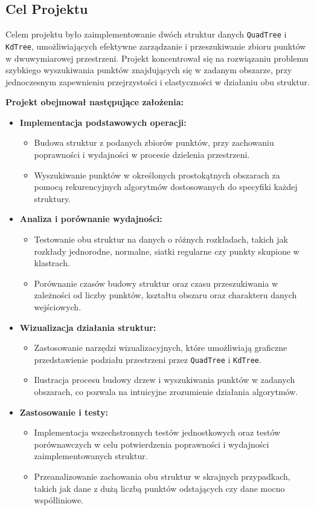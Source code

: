 \documentclass[12pt]{article}
\begin{document}
\subsection{Cel Projektu}
Celem projektu było zaimplementowanie dwóch struktur danych \texttt{QuadTree} i \texttt{KdTree}, umożliwiających efektywne zarządzanie i przeszukiwanie zbioru punktów w dwuwymiarowej przestrzeni. Projekt koncentrował się na rozwiązaniu problemu szybkiego wyszukiwania punktów znajdujących się w zadanym obszarze, przy jednoczesnym zapewnieniu przejrzystości i elastyczności w działaniu obu struktur.

\noindent \textbf{Projekt obejmował następujące założenia:}

\begin{itemize}
    \item \textbf{Implementacja podstawowych operacji:}
    \begin{itemize}
        \item Budowa struktur z podanych zbiorów punktów, przy zachowaniu poprawności i wydajności w procesie dzielenia przestrzeni.
        \item Wyszukiwanie punktów w określonych prostokątnych obszarach za pomocą rekurencyjnych algorytmów dostosowanych do specyfiki każdej struktury.
    \end{itemize}
    \item \textbf{Analiza i porównanie wydajności:}
    \begin{itemize}
        \item Testowanie obu struktur na danych o różnych rozkładach, takich jak rozkłady jednorodne, normalne, siatki regularne czy punkty skupione w klastrach.
        \item Porównanie czasów budowy struktur oraz czasu przeszukiwania w zależności od liczby punktów, kształtu obszaru oraz charakteru danych wejściowych.
    \end{itemize}
    \item \textbf{Wizualizacja działania struktur:}
    \begin{itemize}
        \item Zastosowanie narzędzi wizualizacyjnych, które umożliwiają graficzne przedstawienie podziału przestrzeni przez \texttt{QuadTree} i \texttt{KdTree}.
        \item Ilustracja procesu budowy drzew i wyszukiwania punktów w zadanych obszarach, co pozwala na intuicyjne zrozumienie działania algorytmów.
    \end{itemize}
    \item \textbf{Zastosowanie i testy:}
    \begin{itemize}
        \item Implementacja wszechstronnych testów jednostkowych oraz testów porównawczych w celu potwierdzenia poprawności i wydajności zaimplementowanych struktur.
        \item Przeanalizowanie zachowania obu struktur w skrajnych przypadkach, takich jak dane z dużą liczbą punktów odstających czy dane mocno współliniowe.
    \end{itemize}
\end{itemize}
\end{document}

